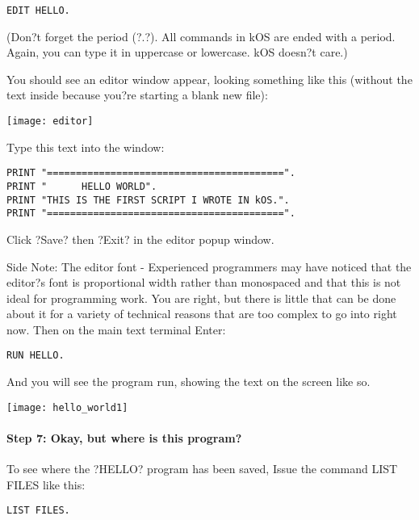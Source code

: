 \begin{Verbatim}[frame=single]
EDIT HELLO.
\end{Verbatim} 

(Don?t forget the period (?.?). All commands in kOS are ended with a period. Again, you can type it in uppercase or lowercase. kOS doesn?t care.)

You should see an editor window appear, looking something like this (without the text inside because you?re starting a blank new file):

\begin{center}
\texttt{[image: editor]}
\end{center}

Type this text into the window:

\begin{Verbatim}[frame=single]
PRINT "=========================================".
PRINT "      HELLO WORLD".
PRINT "THIS IS THE FIRST SCRIPT I WROTE IN kOS.".
PRINT "=========================================".
\end{Verbatim} 

Click ?Save? then ?Exit? in the editor popup window.

Side Note: The editor font - Experienced programmers may have noticed that the editor?s font is proportional width rather than monospaced and that this is not ideal for programming work. You are right, but there is little that can be done about it for a variety of technical reasons that are too complex to go into right now.
Then on the main text terminal Enter:

\begin{Verbatim}[frame=single]
RUN HELLO.
\end{Verbatim} 

And you will see the program run, showing the text on the screen like so.

\begin{center}
\texttt{[image: hello\_world1]}
\end{center}

\paragraph{Step 7: Okay, but where is this program?}
To see where the ?HELLO? program has been saved, Issue the command LIST FILES like this:

\begin{Verbatim}[frame=single]
LIST FILES.
\end{Verbatim} 


